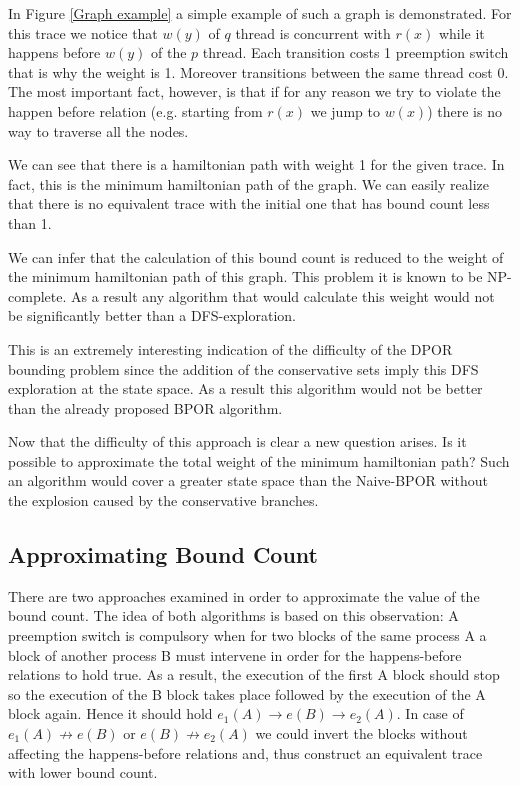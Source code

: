 
In Figure \ref{Graph example} a simple example of such a graph is demonstrated. For this trace we notice that $w(y)$ of $q$ thread is concurrent with $r(x)$ while 
it happens before $w(y)$ of the $p$ thread. Each transition costs 1 preemption switch that is why the weight is 1. Moreover transitions between the same thread cost 0.
The most important fact, however, is that if for any reason we try to violate the happen before relation (e.g. starting from $r(x)$ we jump to $w(x)$) there is no way to 
traverse all the nodes. 

We can see that there is a hamiltonian path with weight 1 for the given trace. In fact, this is the minimum hamiltonian path of the graph. We can easily realize that 
there is no equivalent trace with the initial one that has bound count less than 1. 

We can infer that the calculation of this bound count is reduced to the weight of the minimum hamiltonian path of this graph. This problem it is known to be NP-complete. 
As a result any algorithm that would calculate this weight would not be significantly better than a DFS-exploration. 

This is an extremely interesting indication of the difficulty of the DPOR bounding problem since the addition of the conservative sets imply this DFS
exploration at the state space. As a result this algorithm would not be better than the already proposed BPOR algorithm.

Now that the difficulty of this approach is clear a new question arises. Is it possible to approximate the total weight of the minimum hamiltonian path?
Such an algorithm would cover a greater state space than the Naive-BPOR without the explosion caused by the conservative branches.

\subsection{Approximating Bound Count}
There are two approaches examined in order to approximate the value of the bound count. The idea of both algorithms is based on this observation: 
A preemption switch is compulsory
when for two blocks of the same process A a block of another process B must intervene in order for the happens-before relations to hold true. As a result, the execution of 
the first A block should stop so the execution of the B block takes place followed by the execution of the A block again. Hence it should hold $e_1(A) \rightarrow e(B) \rightarrow e_2(A)$.
In case of $e_1(A) \not \rightarrow e(B)$ or $e(B) \not \rightarrow e_2(A)$ we could invert the blocks without affecting the happens-before relations and, thus construct an
equivalent trace with lower bound count.


